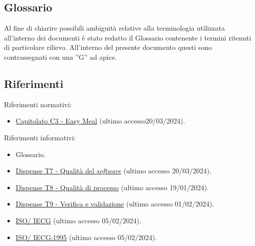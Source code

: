 \subsection{Glossario}
Al fine di chiarire possibili ambiguità relative alla terminologia utilizzata all'interno dei documenti è stato redatto il Glossario contenente i termini ritenuti di particolare rilievo.
All'interno del presente documento questi sono contrassegnati con una ”G” ad apice.

\subsection{Riferimenti}
Riferimenti normativi:
\begin{itemize}
	\item \href{https://www.math.unipd.it/~tullio/IS-1/2023/Progetto/C3.pdf}{Capitolato C3 - Easy Meal} (ultimo accesso20/03/2024).
\end{itemize}

\noindent
Riferimenti informativi:
\begin{itemize}
	\item Glossario.
	\item \href{https://www.math.unipd.it/~tullio/IS-1/2023/Dispense/T7.pdf}{Dispense T7 - Qualità del \textit{software}} (ultimo accesso 20/03/2024).
	\item \href{https://www.math.unipd.it/~tullio/IS-1/2023/Dispense/T8.pdf}{Dispense T8 - Qualità di processo} (ultimo accesso 19/01/2024).
	\item \href{https://www.math.unipd.it/~tullio/IS-1/2023/Dispense/T9.pdf}{Dispense T9 - Verifica e validazione} (ultimo accesso 01/02/2024).
	\item \href{https://it.wikipedia.org/wiki/ISO/IEC_9126}{ISO\g/ IECG} (ultimo accesso 05/02/2024).
	\item \href{https://www.math.unipd.it/~tullio/IS-1/2009/Approfondimenti/ISO_12207-1995.pdf}{ISO\g/ IECG:1995} (ultimo accesso 05/02/2024).
\end{itemize}
